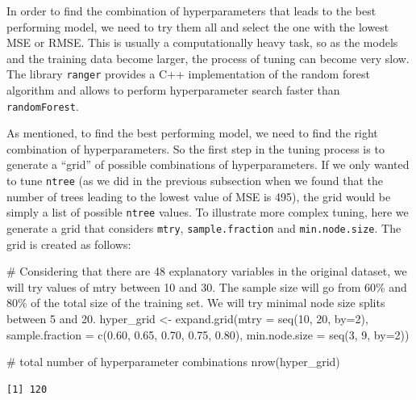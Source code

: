 \documentclass[
  letterpaper,
  DIV=11,
  numbers=noendperiod]{scrreprt}
\newenvironment{Shaded}{\begin{snugshade}}{\end{snugshade}}
\newcommand{\AttributeTok}[1]{\textcolor[rgb]{0.40,0.45,0.13}{#1}}
\newcommand{\CommentTok}[1]{\textcolor[rgb]{0.37,0.37,0.37}{#1}}
\newcommand{\DecValTok}[1]{\textcolor[rgb]{0.68,0.00,0.00}{#1}}
\newcommand{\FloatTok}[1]{\textcolor[rgb]{0.68,0.00,0.00}{#1}}
\newcommand{\FunctionTok}[1]{\textcolor[rgb]{0.28,0.35,0.67}{#1}}
\newcommand{\NormalTok}[1]{\textcolor[rgb]{0.00,0.23,0.31}{#1}}
\newcommand{\OtherTok}[1]{\textcolor[rgb]{0.00,0.23,0.31}{#1}}
\begin{document}
In order to find the combination of hyperparameters that leads to the
best performing model, we need to try them all and select the one with
the lowest MSE or RMSE. This is usually a computationally heavy task, so
as the models and the training data become larger, the process of tuning
can become very slow. The library \texttt{ranger} provides a C++
implementation of the random forest algorithm and allows to perform
hyperparameter search faster than \texttt{randomForest}.

As mentioned, to find the best performing model, we need to find the
right combination of hyperparameters. So the first step in the tuning
process is to generate a ``grid'' of possible combinations of
hyperparameters. If we only wanted to tune \texttt{ntree} (as we did in
the previous subsection when we found that the number of trees leading
to the lowest value of MSE is 495), the grid would be simply a list of
possible \texttt{ntree} values. To illustrate more complex tuning, here
we generate a grid that considers \texttt{mtry},
\texttt{sample.fraction} and \texttt{min.node.size}. The grid is created
as follows:

\begin{Shaded}
\begin{Highlighting}[]
\CommentTok{\# Considering that there are 48 explanatory variables in the original dataset, we will try values of mtry between 10 and 30. The sample size will go from 60\% and 80\% of the total size of the training set. We will try minimal node size splits between 5 and 20.}
\NormalTok{hyper\_grid }\OtherTok{\textless{}{-}} \FunctionTok{expand.grid}\NormalTok{(}\AttributeTok{mtry =} \FunctionTok{seq}\NormalTok{(}\DecValTok{10}\NormalTok{, }\DecValTok{20}\NormalTok{, }\AttributeTok{by=}\DecValTok{2}\NormalTok{), }
                          \AttributeTok{sample.fraction =} \FunctionTok{c}\NormalTok{(}\FloatTok{0.60}\NormalTok{, }\FloatTok{0.65}\NormalTok{, }\FloatTok{0.70}\NormalTok{, }\FloatTok{0.75}\NormalTok{, }\FloatTok{0.80}\NormalTok{),}
                          \AttributeTok{min.node.size =} \FunctionTok{seq}\NormalTok{(}\DecValTok{3}\NormalTok{, }\DecValTok{9}\NormalTok{, }\AttributeTok{by=}\DecValTok{2}\NormalTok{))}

\CommentTok{\# total number of hyperparameter combinations}
\FunctionTok{nrow}\NormalTok{(hyper\_grid)}
\end{Highlighting}
\end{Shaded}

\begin{verbatim}
[1] 120
\end{verbatim}
\end{document}
